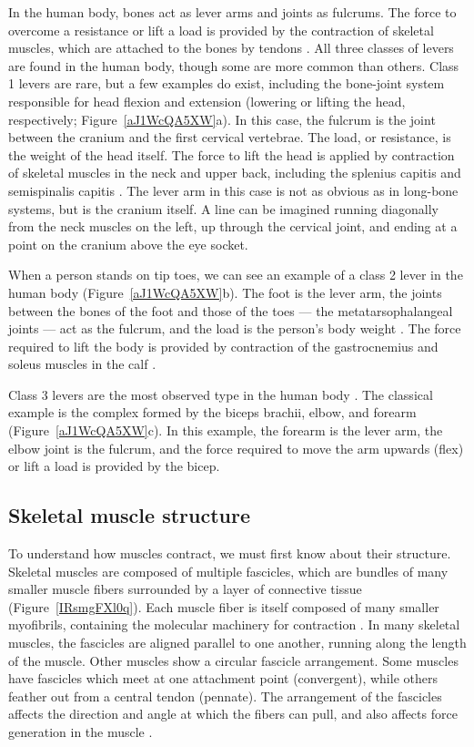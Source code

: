 \documentclass{article}
\begin{document}
In the human body, bones act as lever arms and joints as fulcrums. The force to overcome a resistance or lift a load is provided by the contraction of skeletal muscles, which are attached to the bones by tendons \citep{leversOLI, guyton2016book, openStax_lever}. All three classes of levers are found in the human body, though some are more common than others. Class 1 levers are rare, but a few examples do exist, including the bone-joint system responsible for head flexion and extension (lowering or lifting the head, respectively; Figure~\ref{aJ1WcQA5XW}a). In this case, the fulcrum is the joint between the cranium and the first cervical vertebrae. The load, or resistance, is the weight of the head itself. The force to lift the head is applied by contraction of skeletal muscles in the neck and upper back, including the splenius capitis and semispinalis capitis \citep{openStax_axial}. The lever arm in this case is not as obvious as in long-bone systems, but is the cranium itself. A line can be imagined running diagonally from the neck muscles on the left, up through the cervical joint, and ending at a point on the cranium above the eye socket.

When a person stands on tip toes, we can see an example of a class 2 lever in the human body (Figure~\ref{aJ1WcQA5XW}b). The foot is the lever arm, the joints between the bones of the foot and those of the toes --- the metatarsophalangeal joints \citep{openStax_lower} --- act as the fulcrum, and the load is the person's body weight \citep{leversOLI}. The force required to lift the body is provided by contraction of the gastrocnemius and soleus muscles in the calf \citep{openStax_limbs}.

Class 3 levers are the most observed type in the human body \citep{leversOLI}. The classical example is the complex formed by the biceps brachii, elbow, and forearm (Figure~\ref{aJ1WcQA5XW}c). In this example, the forearm is the lever arm, the elbow joint is the fulcrum, and the force required to move the arm upwards (flex) or lift a load is provided by the bicep.

\subsection{Skeletal muscle structure}

To understand how muscles contract, we must first know about their structure. Skeletal muscles are composed of multiple fascicles, which are bundles of many smaller muscle fibers surrounded by a layer of connective tissue (Figure~\ref{IRsmgFXl0q}). Each muscle fiber is itself composed of many smaller myofibrils, containing the molecular machinery for contraction \citep{guyton2016book, openStax_muscle}. In many skeletal muscles, the fascicles are aligned parallel to one another, running along the length of the muscle. Other muscles show a circular fascicle arrangement. Some muscles have fascicles which meet at one attachment point (convergent), while others feather out from a central tendon (pennate). The arrangement of the fascicles affects the direction and angle at which the fibers can pull, and also affects force generation in the muscle \citep{openStax_lever}.
\end{document}
